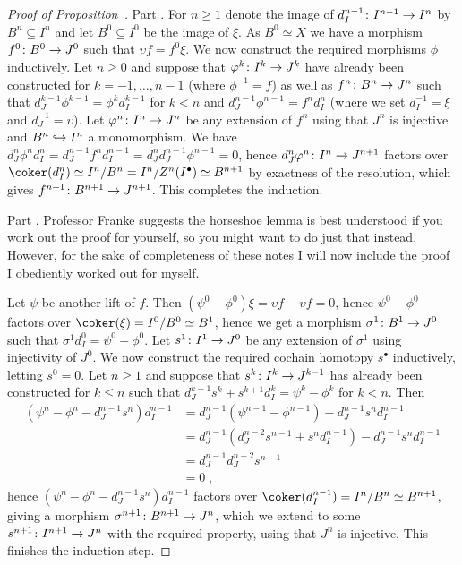 \documentclass[a4paper,parskip=half,numbers=enddot, DIV=12]{scrreprt}
\begin{document}
\begin{proof}[Proof of Proposition~]
	Part . For $n\geq 1$ denote the image of $d_{I }^{n-1}\colon I^{n-1}\morphism I^n$ by $B^n\subseteq I^n$ and let $B^0\subseteq I^0$ be the image of $\xi$. As $B^0\simeq X$ we have a morphism $f^0\colon B^0\morphism J^0$ such that $\upsilon f=f^0\xi$. We now construct the required morphisms $\phi $ inductively. Let $n\geq 0$ and suppose that $\phi^k\colon I^k\morphism J^k$ have already been constructed for $k=-1,\ldots,n-1$ (where $\phi^{-1}=f$) as well as $f^n\colon B^n\morphism J^n$ such that $d_{J }^{k-1}\phi^{k-1}=\phi^kd_{I }^{k-1}$ for $k< n$ and $d_{J  }^{n-1}\phi^{n-1}=f^nd_{I }^n$ (where we set $d_{I }^{-1}=\xi$ and $d_{J }^{-1}=\upsilon$). Let $\phi^n\colon I^n\morphism J^n$ be any extension of $f^n$ using that $J^n$ is injective and $B^n\monomorphism I^n$ a monomorphism. We have $d_{J }^{n}\phi ^nd_{I }^n=d_{J }^{n-1}f^nd_{I }^{n-1}=d_{J }^nd_{J }^{n-1}\phi^{n-1}=0$, hence $d_{J }^n\phi^n\colon I^n\morphism J^{n+1}$ factors over $\coker(d_{I }^n)\simeq I^n/B^n=I^n/Z^n(I^\bullet )\simeq B^{n+1}$ by exactness of the resolution, which gives $f^{n+1}\colon B^{n+1}\morphism J^{n+1}$. This completes the induction.
	
	Part . Professor Franke suggests the horseshoe lemma is best understood if you work out the proof for yourself, so you might want to do just that instead. However, for the sake of completeness of these notes I will now include the proof I obediently worked out for myself.
	
	Let $\psi $ be another lift of $f$. Then $(\psi^0-\phi^0)\xi=\upsilon f-\upsilon f=0$, hence $\psi^0-\phi^0$ factors over $\coker(\xi)=I^0/B^0\simeq B^1$, hence we get a morphism $\sigma^1\colon B^1\morphism J^0$ such that $\sigma^1d_{I }^0=\psi^0-\phi^0$. Let $s^1\colon I^1\morphism J^0$ be any extension of $\sigma^1$ using injectivity of $J^0$. We now construct the required cochain homotopy $s^\bullet $ inductively, letting $s^0=0$. Let $n\geq 1$ and suppose that $s^k\colon I^k\morphism J^{k-1}$ has already been constructed for $k\leq n$ such that $d_{J }^{k-1}s^k+s^{k+1}d_{I }^k=\psi^k-\phi^k$ for $k<n$. Then
	\begin{align*}
		\left(\psi^n-\phi^n-d_{J }^{n-1}s^n\right)d_{I }^{n-1}&=d_{J }^{n-1}\left(\psi^{n-1}-\phi^{n-1}\right)-d_{J }^{n-1}s^nd_{I }^{n-1}\\
		&=d_{J }^{n-1}\left(d_{J }^{n-2}s^{n-1}+s^nd_{I }^{n-1}\right)-d_{J }^{n-1}s^nd_{I }^{n-1}\\
		&=d_{J }^{n-1}d_{J }^{n-2}s^{n-1}\\
		&=0\;,
	\end{align*}
	hence $(\psi^n-\phi^n-d_{J }^{n-1}s^n)d_{I }^{n-1}$ factors over $\coker(d_{I }^{n-1})=I^n/B^n\simeq B^{n+1}$, giving a morphism $\sigma^{n+1}\colon B^{n+1}\morphism J^n$, which we extend to some $s^{n+1}\colon I^{n+1}\morphism J^n$ with the required property, using that $J^n$ is injective. This finishes the induction step.
	

\end{proof}
\end{document}
